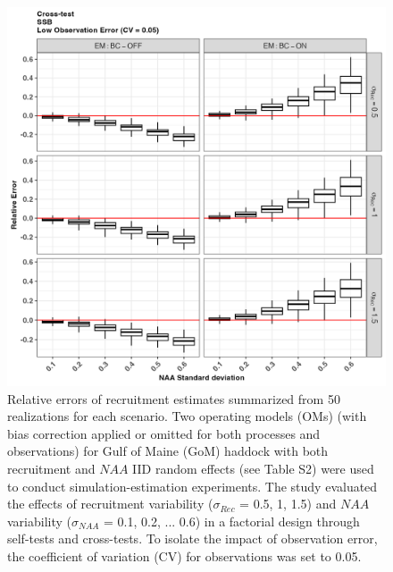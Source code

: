 \documentclass[
  12pt,
]{article}
\begin{document}
\begin{figure}[H]
\centering
\includegraphics[width=\textwidth]{Original_Figures&Tables/SSB_low_cross_RE.PNG}
\caption{Relative errors of recruitment estimates summarized from 50 realizations for each scenario. Two operating models (OMs) (with bias correction applied or omitted for both processes and observations) for Gulf of Maine (GoM) haddock with both recruitment and $NAA$ IID random effects (see Table S2) were used to conduct simulation-estimation experiments. The study evaluated the effects of recruitment variability ($\sigma_{Rec}$ = 0.5, 1, 1.5) and $NAA$ variability ($\sigma_{NAA}$ = 0.1, 0.2, ... 0.6) in a factorial design through self-tests and cross-tests. To isolate the impact of observation error, the coefficient of variation (CV) for observations was set to 0.05.}
\label{fig:supp_SSB_low_cross_RE} 
\end{figure}
\end{document}
